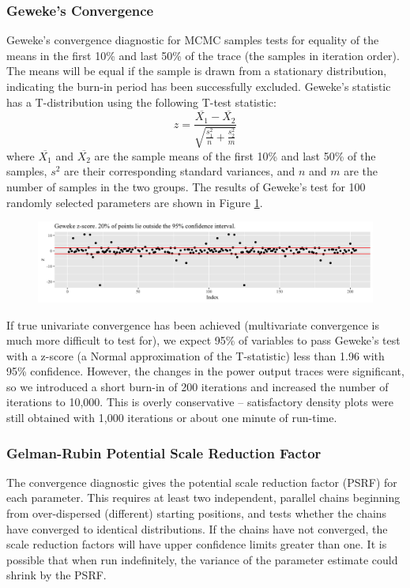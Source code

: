 \documentclass[a4paper, 12pt]{article}
\begin{document}
\subsubsection{Geweke's Convergence}
Geweke's convergence diagnostic for MCMC samples tests for equality of the means in the first 10\% and last 50\% of the trace (the samples in iteration order). The means will be equal if the sample is drawn from a stationary distribution, indicating the burn-in period has been successfully excluded. Geweke's statistic has a T-distribution using the following T-test statistic:
\begin{equation}
z=\frac{\overline{X_1}-\overline{X_2}}{\sqrt{\frac{s_1^2}{n} + \frac{s_2^2}{m}}}
\end{equation}
where $\overline{X_1}$ and $\overline{X_2}$ are the sample means of the first 10\% and last 50\% of the samples, $s^2$ are their corresponding standard variances, and $n$ and $m$ are the number of samples in the two groups. The results of Geweke's test for 100 randomly selected parameters are shown in Figure \ref{fig:geweke}.

\begin{figure}
  \centering
  \includegraphics[width=\linewidth]{media/geweke}
  \label{fig:geweke}
\end{figure}

If true univariate convergence has been achieved (multivariate convergence is much more difficult to test for), we expect 95\% of variables to pass Geweke's test with a z-score (a Normal approximation of the T-statistic) less than 1.96 with 95\% confidence. However, the changes in the power output traces were significant, so we introduced a short burn-in of 200 iterations and increased the number of iterations to 10,000. This is overly conservative -- satisfactory density plots were still obtained with 1,000 iterations or about one minute of run-time.

\subsubsection{Gelman-Rubin Potential Scale Reduction Factor}
The \citet{Gelman:1992} convergence diagnostic gives the potential scale reduction factor (PSRF) for each parameter. This requires at least two independent, parallel chains beginning from over-dispersed (different) starting positions, and tests whether the chains have converged to identical distributions. If the chains have not converged, the scale reduction factors will have upper confidence limits greater than one. It is possible that when run indefinitely, the variance of the parameter estimate could shrink by the PSRF.
\end{document}
